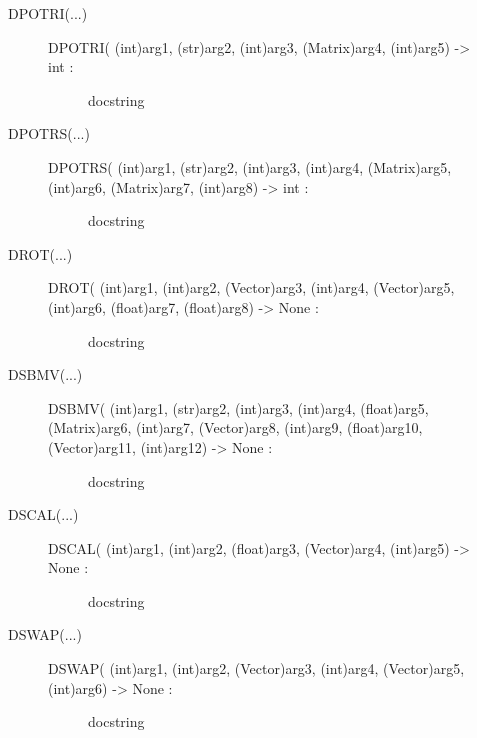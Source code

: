 \documentclass[letterpaper,10pt,english]{sphinxmanual}
\begin{document}
\begin{description}
\begin{description}
\begin{description}
\end{description}

\item[{DPOTRI(...)}] \leavevmode\begin{description}
\item[{DPOTRI( (int)arg1, (str)arg2, (int)arg3, (Matrix)arg4, (int)arg5) -\textgreater{} int :}] \leavevmode
docstring

\end{description}

\item[{DPOTRS(...)}] \leavevmode\begin{description}
\item[{DPOTRS( (int)arg1, (str)arg2, (int)arg3, (int)arg4, (Matrix)arg5, (int)arg6, (Matrix)arg7, (int)arg8) -\textgreater{} int :}] \leavevmode
docstring

\end{description}

\item[{DROT(...)}] \leavevmode\begin{description}
\item[{DROT( (int)arg1, (int)arg2, (Vector)arg3, (int)arg4, (Vector)arg5, (int)arg6, (float)arg7, (float)arg8) -\textgreater{} None :}] \leavevmode
docstring

\end{description}

\item[{DSBMV(...)}] \leavevmode\begin{description}
\item[{DSBMV( (int)arg1, (str)arg2, (int)arg3, (int)arg4, (float)arg5, (Matrix)arg6, (int)arg7, (Vector)arg8, (int)arg9, (float)arg10, (Vector)arg11, (int)arg12) -\textgreater{} None :}] \leavevmode
docstring

\end{description}

\item[{DSCAL(...)}] \leavevmode\begin{description}
\item[{DSCAL( (int)arg1, (int)arg2, (float)arg3, (Vector)arg4, (int)arg5) -\textgreater{} None :}] \leavevmode
docstring

\end{description}

\item[{DSWAP(...)}] \leavevmode\begin{description}
\item[{DSWAP( (int)arg1, (int)arg2, (Vector)arg3, (int)arg4, (Vector)arg5, (int)arg6) -\textgreater{} None :}] \leavevmode
docstring


\end{description}
\end{description}
\end{description}
\end{document}
